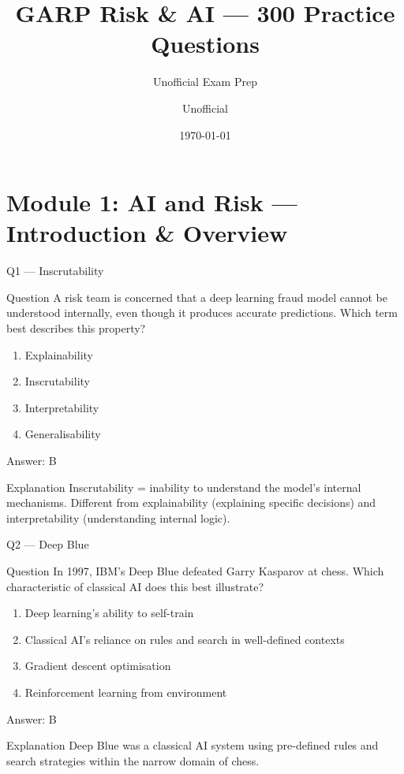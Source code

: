 \documentclass[aspectratio=169,8pt]{beamer}
\title[GARP RAI]{GARP Risk \& AI --- 300 Practice Questions}
\subtitle{Unofficial Exam Prep}
\author{Unofficial}
\date{\today}
\begin{document}
	\begin{frame}\titlepage\end{frame}
	
	\section{Module 1: AI and Risk --- Introduction \& Overview}
	
	\begin{frame}{Q1 --- Inscrutability}
		\begin{block}{Question}
			A risk team is concerned that a deep learning fraud model cannot be understood internally, even though it produces accurate predictions. Which term best describes this property?
		\end{block}
		\begin{enumerate}
			\item Explainability
			\item Inscrutability
			\item Interpretability
			\item Generalisability
		\end{enumerate}
		\begin{exampleblock}{Answer: B}\end{exampleblock}
		\begin{block}{Explanation}
			Inscrutability = inability to understand the model's internal mechanisms. Different from explainability (explaining specific decisions) and interpretability (understanding internal logic).
		\end{block}
	\end{frame}
	
	\begin{frame}{Q2 --- Deep Blue}
		\begin{block}{Question}
			In 1997, IBM's Deep Blue defeated Garry Kasparov at chess. Which characteristic of classical AI does this best illustrate?
		\end{block}
		\begin{enumerate}
			\item Deep learning's ability to self-train
			\item Classical AI's reliance on rules and search in well-defined contexts
			\item Gradient descent optimisation
			\item Reinforcement learning from environment
		\end{enumerate}
		\begin{exampleblock}{Answer: B}\end{exampleblock}
		\begin{block}{Explanation}
			Deep Blue was a classical AI system using pre-defined rules and search strategies within the narrow domain of chess.
		\end{block}
	\end{frame}
	
\end{document}
